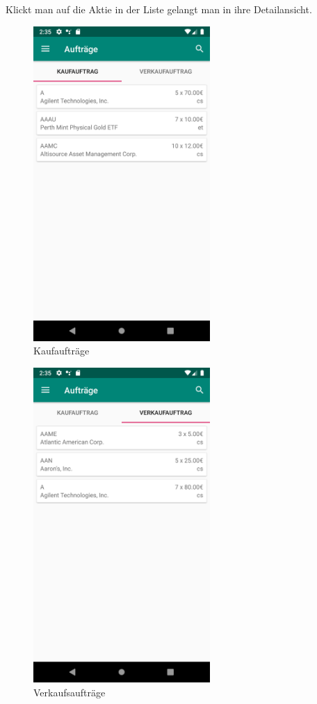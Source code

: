 \documentclass[10pt]{scrartcl}
\begin{document}
Klickt man auf die Aktie in der Liste gelangt man in ihre Detailansicht.

\begin{figure}[H]
	\centering
	\includegraphics[width=0.6\textwidth]{Bilder/Applikation/Kaufauftrag.png}
	\caption{Kaufaufträge}
\end{figure}

\begin{figure}[H]
	\centering
	\includegraphics[width=0.6\textwidth]{Bilder/Applikation/Verkaufauftrag.png}
	\caption{Verkaufsaufträge}
\end{figure}
\end{document}
